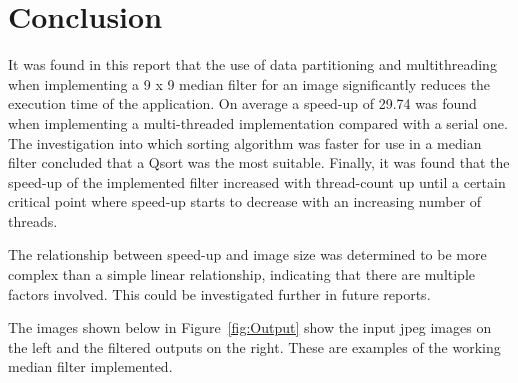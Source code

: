 \section{Conclusion}
It was found in this report that the use of data partitioning and multithreading when implementing a 9 x 9 median filter for an image significantly reduces the execution time of the application. On average a speed-up of 29.74 was found when implementing a multi-threaded implementation compared with a serial one. The investigation into which sorting algorithm was faster for use in a median filter concluded that a Qsort was the most suitable. Finally, it was found that the speed-up of the implemented filter increased with thread-count up until a certain critical point where speed-up starts to decrease with an increasing number of threads.

The relationship between speed-up and image size was determined to be more complex than a simple linear relationship, indicating that there are multiple factors involved. This could be investigated further in future reports.


The images shown below in Figure~\ref{fig:Output} show the input jpeg images on the left and the filtered outputs on the right. These are examples of the working median filter implemented.
